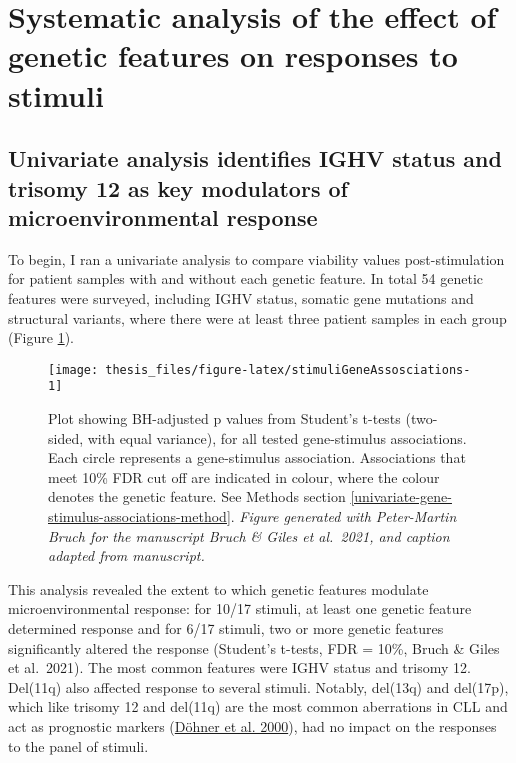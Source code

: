 \documentclass[11pt, a4paper, twosided]{book}
\begin{document}
\hypertarget{systematic-analysis-of-the-effect-of-genetic-features-on-responses-to-stimuli}{%
\section{Systematic analysis of the effect of genetic features on responses to stimuli}\label{systematic-analysis-of-the-effect-of-genetic-features-on-responses-to-stimuli}}

\hypertarget{univariate-gene-stimulus-assosciations}{%
\subsection{Univariate analysis identifies IGHV status and trisomy 12 as key modulators of microenvironmental response}\label{univariate-gene-stimulus-assosciations}}

To begin, I ran a univariate analysis to compare viability values post-stimulation for patient samples with and without each genetic feature. In total 54 genetic features were surveyed, including IGHV status, somatic gene mutations and structural variants, where there were at least three patient samples in each group (Figure \ref{fig:stimuliGeneAssosciations}).


\begin{figure}

{\centering \texttt{[image: thesis\_files/figure-latex/stimuliGeneAssosciations-1]} 

}

\caption{Plot showing BH-adjusted p values from Student's t-tests (two-sided, with equal variance), for all tested gene-stimulus associations. Each circle represents a gene-stimulus association. Associations that meet 10\% FDR cut off are indicated in colour, where the colour denotes the genetic feature. See Methods section \ref{univariate-gene-stimulus-associations-method}. \emph{Figure generated with Peter-Martin Bruch for the manuscript Bruch \& Giles et al.~2021, and caption adapted from manuscript.}}\label{fig:stimuliGeneAssosciations}
\end{figure}
This analysis revealed the extent to which genetic features modulate microenvironmental response: for 10/17 stimuli, at least one genetic feature determined response and for 6/17 stimuli, two or more genetic features significantly altered the response (Student's t-tests, FDR = 10\%, Bruch \& Giles et al.~2021). The most common features were IGHV status and trisomy 12. Del(11q) also affected response to several stimuli. Notably, del(13q) and del(17p), which like trisomy 12 and del(11q) are the most common aberrations in CLL and act as prognostic markers (\protect\hyperlink{ref-Dohner2000}{Döhner et al. 2000}), had no impact on the responses to the panel of stimuli.
\end{document}
